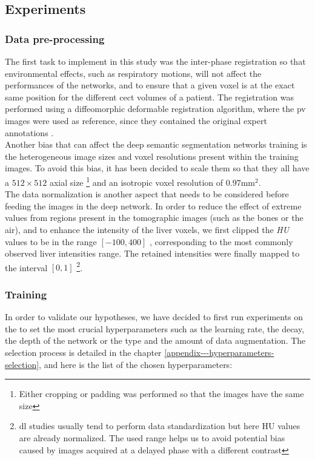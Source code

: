 \subsection{Experiments}

\subsubsection{Data pre-processing}

The first task to implement in this study was the inter-phase
registration so that environmental effects, such as respiratory motions,
will not affect the performances of the networks, and to ensure that a
given voxel is at the exact same position for the different \ac{cect}
volumes of a patient. The registration was performed using a
diffeomorphic deformable registration algorithm, where the \ac{pv}
images were used as reference, since they contained the original expert
annotations \cite{Avants2008, Conze2017, Ben-Cohen, Christ2017}. \\
Another bias that can affect the deep semantic segmentation networks
training is the heterogeneous image sizes and voxel resolutions present
within the training images.
To avoid this bias, it has been decided to scale them so that they all
have a $ 512\times512 $ axial size \footnote{Either cropping or padding was performed so that the images have the same size} and an isotropic voxel resolution of $ 0.97 \text{mm}^2 $. \\
The data normalization is another aspect that needs to be considered
before feeding the images in the deep network. In order to reduce the
effect of extreme values from regions present in the tomographic images
(such as the bones or the air), and to enhance the intensity of the
liver voxels, we first clipped the \emph{HU} values to be in the range
$ \left[-100, 400\right] $ , corresponding to the most commonly 
observed liver intensities range. The retained intensities were finally mapped to
the interval $ \left[0, 1\right]$ \footnote{\ac{dl} studies usually tend to perform 
data standardization but here HU values are already normalized. 
The used range helps us to avoid potential bias caused by images acquired at a delayed phase with a different contrast}.

\subsubsection{Training}

In order to validate our hypotheses, we have decided to first run
experiments on the  to set the most crucial hyperparameters
such as the learning rate, the decay, the depth of the network or the
type and the amount of data augmentation.
The selection process is detailed in the chapter \ref{appendix---hyperparameters-selection}, and here is the list of the chosen hyperparameters:

